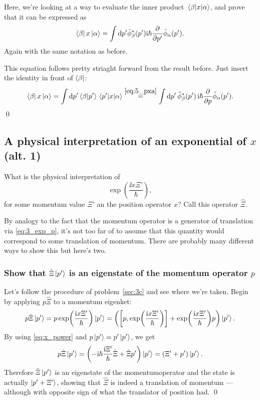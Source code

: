 \documentclass[11pt,letter, swedish, english
]{article}
\begin{document}
\subsubsection{}
Here, we're looking at a way to evaluate the inner product
$\mel{\beta}{x}{\alpha}$, and prove that it can be expressed as
\begin{equation}
\bra{\beta}x\ket{\alpha} 
= \int \rd{p'} \tilde\phi^*_\beta(p')\ii\hbar \pdv{p'} \tilde\phi_\alpha(p').
\end{equation}
Again with the same notation as before.

This equation follows pretty striaght forward from the result
before. Just insert the identity in front of $\bra{\beta}$:
\begin{equation}
\bra{\beta}x\ket{\alpha} 
= \int\dd{p'} \braket{\beta}{p'}\mel{p'}{x}{\alpha}
\stackrel{\eqref{eq:5_pxa}}{=} \int\dd{p'} 
\tilde\phi_\beta^*(p') \, \ii\hbar \pdv{p}\tilde\phi_\alpha(p').
\end{equation}
\qed


\subsection{A physical interpretation of an exponential of $x$ (alt. 1)}
What is the physical interpretation of 
\begin{equation}
\exp(\frac{\ii x\Xi'}{\hbar}),
\end{equation}
for some momentum value $\Xi'$ an the position operator $x$? Call this
operator $\hat\Xi$. 


By analogy to the fact that the momentum operator is a generator of
translation via \eqref{eq:3_exp_p}, it's not too far of to assume that
this quantity would correspond to some translation of momentum. 
There are probably many different ways to show this but here's two.

\subsubsection{Show that $\hat\Xi\ket{p'}$ is an eigenstate of the
  momentum operator $p$}
Let's follow the procedure of problem~\ref{sec:3c} and see where we're
taken. 
Begin by applying $p\hat\Xi$ to a momentum eigenket:
\begin{equation}
p\hat\Xi\ket{p'}=p\exp(\frac{\ii x\Xi'}{\hbar})\ket{p'} 
= \qty(\comm{p}{\exp(\frac{\ii x\Xi'}{\hbar})}+\exp(\frac{\ii x\Xi'}{\hbar})p)
\ket{p'}.
\end{equation}
By using \eqref{eq:x_power} and $p\ket{p'}=p'\ket{p'}$, we get
\begin{equation}
p\hat\Xi\ket{p'} = 
\qty( -\mathrm{i}\hbar \frac{\mathrm{i}\Xi'}{\hbar} \hat{\Xi} + \hat\Xi p')\ket{p'} 
= \qty(\Xi'+p')\ket{p'}.
\end{equation}
Therefore $\hat\Xi\ket{p'}$ is an eigenstate of the momentumoperator
and the state is actually $\ket{p'+\Xi'}$, showing that $\hat\Xi$
is indeed a translation of momentum --- although with opposite sign of
what the translator of position had. 
\qed
\end{document}
